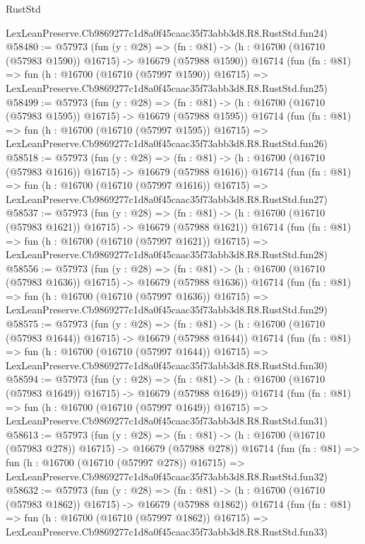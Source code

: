 \begin{lexlean}{RustStd}
\begin{coremodule}
    LexLeanPreserve.Cb9869277c1d8a0f45caac35f73abb3d8.R8.RustStd.fun24)
@58480 := @57973
    (fun (y : @28) =>
    (fn : @81) -> (h : @16700 (@16710 (@57983 @1590)) @16715) -> @16679 (@57988 @1590))
    @16714
    (fun (fn : @81) =>
    fun (h : @16700 (@16710 (@57997 @1590)) @16715) =>
    LexLeanPreserve.Cb9869277c1d8a0f45caac35f73abb3d8.R8.RustStd.fun25)
@58499 := @57973
    (fun (y : @28) =>
    (fn : @81) -> (h : @16700 (@16710 (@57983 @1595)) @16715) -> @16679 (@57988 @1595))
    @16714
    (fun (fn : @81) =>
    fun (h : @16700 (@16710 (@57997 @1595)) @16715) =>
    LexLeanPreserve.Cb9869277c1d8a0f45caac35f73abb3d8.R8.RustStd.fun26)
@58518 := @57973
    (fun (y : @28) =>
    (fn : @81) -> (h : @16700 (@16710 (@57983 @1616)) @16715) -> @16679 (@57988 @1616))
    @16714
    (fun (fn : @81) =>
    fun (h : @16700 (@16710 (@57997 @1616)) @16715) =>
    LexLeanPreserve.Cb9869277c1d8a0f45caac35f73abb3d8.R8.RustStd.fun27)
@58537 := @57973
    (fun (y : @28) =>
    (fn : @81) -> (h : @16700 (@16710 (@57983 @1621)) @16715) -> @16679 (@57988 @1621))
    @16714
    (fun (fn : @81) =>
    fun (h : @16700 (@16710 (@57997 @1621)) @16715) =>
    LexLeanPreserve.Cb9869277c1d8a0f45caac35f73abb3d8.R8.RustStd.fun28)
@58556 := @57973
    (fun (y : @28) =>
    (fn : @81) -> (h : @16700 (@16710 (@57983 @1636)) @16715) -> @16679 (@57988 @1636))
    @16714
    (fun (fn : @81) =>
    fun (h : @16700 (@16710 (@57997 @1636)) @16715) =>
    LexLeanPreserve.Cb9869277c1d8a0f45caac35f73abb3d8.R8.RustStd.fun29)
@58575 := @57973
    (fun (y : @28) =>
    (fn : @81) -> (h : @16700 (@16710 (@57983 @1644)) @16715) -> @16679 (@57988 @1644))
    @16714
    (fun (fn : @81) =>
    fun (h : @16700 (@16710 (@57997 @1644)) @16715) =>
    LexLeanPreserve.Cb9869277c1d8a0f45caac35f73abb3d8.R8.RustStd.fun30)
@58594 := @57973
    (fun (y : @28) =>
    (fn : @81) -> (h : @16700 (@16710 (@57983 @1649)) @16715) -> @16679 (@57988 @1649))
    @16714
    (fun (fn : @81) =>
    fun (h : @16700 (@16710 (@57997 @1649)) @16715) =>
    LexLeanPreserve.Cb9869277c1d8a0f45caac35f73abb3d8.R8.RustStd.fun31)
@58613 := @57973
    (fun (y : @28) =>
    (fn : @81) -> (h : @16700 (@16710 (@57983 @278)) @16715) -> @16679 (@57988 @278))
    @16714
    (fun (fn : @81) =>
    fun (h : @16700 (@16710 (@57997 @278)) @16715) =>
    LexLeanPreserve.Cb9869277c1d8a0f45caac35f73abb3d8.R8.RustStd.fun32)
@58632 := @57973
    (fun (y : @28) =>
    (fn : @81) -> (h : @16700 (@16710 (@57983 @1862)) @16715) -> @16679 (@57988 @1862))
    @16714
    (fun (fn : @81) =>
    fun (h : @16700 (@16710 (@57997 @1862)) @16715) =>
    LexLeanPreserve.Cb9869277c1d8a0f45caac35f73abb3d8.R8.RustStd.fun33)

\end{coremodule}
\end{lexlean}
